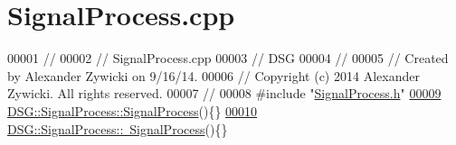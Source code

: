 \hypertarget{_signal_process_8cpp_source}{\section{Signal\+Process.\+cpp}
\label{_signal_process_8cpp_source}
}

\begin{DoxyCode}
00001 \textcolor{comment}{//}
00002 \textcolor{comment}{//  SignalProcess.cpp}
00003 \textcolor{comment}{//  DSG}
00004 \textcolor{comment}{//}
00005 \textcolor{comment}{//  Created by Alexander Zywicki on 9/16/14.}
00006 \textcolor{comment}{//  Copyright (c) 2014 Alexander Zywicki. All rights reserved.}
00007 \textcolor{comment}{//}
00008 \textcolor{preprocessor}{#include "\hyperlink{_signal_process_8h}{SignalProcess.h}"}
\hypertarget{_signal_process_8cpp_source_l00009}{}\hyperlink{class_d_s_g_1_1_signal_process_a3fd4347483bcf3cc0a3d7bf98ff56218}{00009} \hyperlink{class_d_s_g_1_1_signal_process_a3fd4347483bcf3cc0a3d7bf98ff56218}{DSG::SignalProcess::SignalProcess}()\{\}
\hypertarget{_signal_process_8cpp_source_l00010}{}\hyperlink{class_d_s_g_1_1_signal_process_ad9b6a758241a092ddc38e13effc9553f}{00010} \hyperlink{class_d_s_g_1_1_signal_process_ad9b6a758241a092ddc38e13effc9553f}{DSG::SignalProcess::~SignalProcess}()\{\}
\end{DoxyCode}

